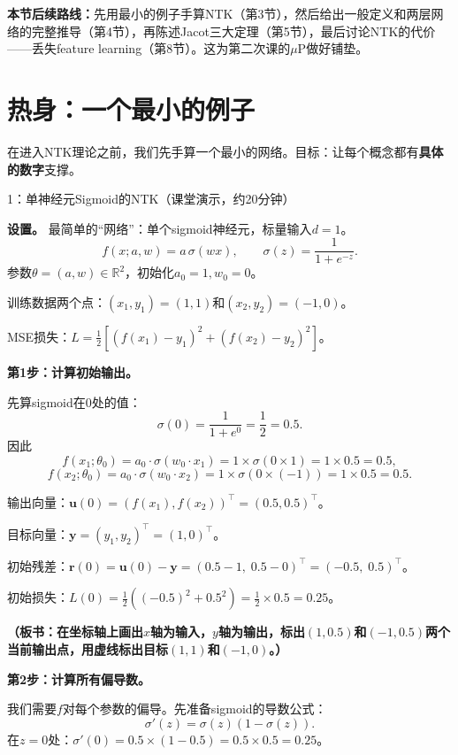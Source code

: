\documentclass[11pt,a4paper]{article}
\newcommand{\R}{\mathbb{R}}
\newcommand{\bu}{\mathbf{u}}
\newcommand{\by}{\mathbf{y}}
\newcommand{\br}{\mathbf{r}}
\begin{document}
\textbf{本节后续路线：}先用最小的例子手算NTK（第3节），然后给出一般定义和两层网络的完整推导（第4节），再陈述Jacot三大定理（第5节），最后讨论NTK的代价——丢失feature learning（第8节）。这为第二次课的$\mu$P做好铺垫。

\section{热身：一个最小的例子}

在进入NTK理论之前，我们先手算一个最小的网络。目标：让每个概念都有\textbf{具体的数字}支撑。

\begin{handcalc}{1：单神经元Sigmoid的NTK（课堂演示，约20分钟）}

\textbf{设置。} 最简单的``网络''：单个sigmoid神经元，标量输入$d=1$。
\[
f(x; a, w) = a\,\sigma(wx), \qquad \sigma(z) = \frac{1}{1+e^{-z}}.
\]
参数$\theta = (a, w) \in \R^2$，初始化$a_0=1, w_0=0$。

训练数据两个点：$(x_1, y_1)=(1, 1)$和$(x_2, y_2)=(-1, 0)$。

MSE损失：$L = \frac{1}{2}[(f(x_1)-y_1)^2 + (f(x_2)-y_2)^2]$。

\tcblower

\textbf{第1步：计算初始输出。}

先算sigmoid在0处的值：
\[
\sigma(0) = \frac{1}{1+e^0} = \frac{1}{2} = 0.5.
\]
因此
\[
f(x_1;\theta_0) = a_0\cdot\sigma(w_0\cdot x_1) = 1\times\sigma(0\times 1) = 1\times 0.5 = 0.5,
\]
\[
f(x_2;\theta_0) = a_0\cdot\sigma(w_0\cdot x_2) = 1\times\sigma(0\times(-1)) = 1\times 0.5 = 0.5.
\]

输出向量：$\bu(0) = (f(x_1), f(x_2))^\top = (0.5, 0.5)^\top$。

目标向量：$\by = (y_1, y_2)^\top = (1, 0)^\top$。

初始残差：$\br(0) = \bu(0) - \by = (0.5-1,\; 0.5-0)^\top = (-0.5,\; 0.5)^\top$。

初始损失：$L(0) = \frac{1}{2}((-0.5)^2 + 0.5^2) = \frac{1}{2}\times 0.5 = 0.25$。

\textbf{（板书：在坐标轴上画出$x$轴为输入，$y$轴为输出，标出$(1,0.5)$和$(-1,0.5)$两个当前输出点，用虚线标出目标$(1,1)$和$(-1,0)$。）}

\bigskip
\textbf{第2步：计算所有偏导数。}

我们需要$f$对每个参数的偏导。先准备sigmoid的导数公式：
\[
\sigma'(z) = \sigma(z)(1-\sigma(z)).
\]
在$z=0$处：$\sigma'(0) = 0.5\times(1-0.5) = 0.5\times 0.5 = 0.25$。


\end{handcalc}
\end{document}
